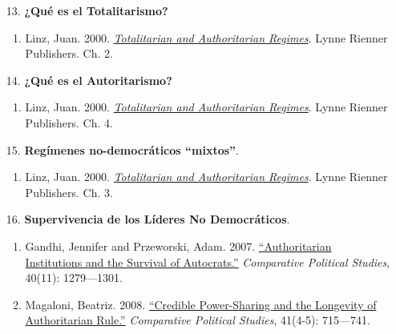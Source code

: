 \documentclass[letterpaper]{article}
\begin{document}
\begin{enumerate}
\begin{enumerate}
				\item[13.] {\bf ¿Qu\'e es el Totalitarismo?}
					\begin{enumerate}
						\item Linz, Juan. 2000. \href{https://github.com/hbahamonde/Ciencia_Politica_I/raw/master/Readings/Linz_2000.pdf}{\emph{Totalitarian and Authoritarian Regimes}}. Lynne Rienner Publishers. Ch. 2.
					\end{enumerate}

				\item[14.] {\bf ¿Qu\'e es el Autoritarismo?}
					\begin{enumerate}
						\item Linz, Juan. 2000. \href{https://github.com/hbahamonde/Ciencia_Politica_I/raw/master/Readings/Linz_2000.pdf}{\emph{Totalitarian and Authoritarian Regimes}}. Lynne Rienner Publishers. Ch. 4.
					\end{enumerate}


        \item[15.] {\bf Reg\'imenes no-democr\'aticos ``mixtos''}.
          \begin{enumerate}
            \item Linz, Juan. 2000. \href{https://github.com/hbahamonde/Ciencia_Politica_I/raw/master/Readings/Linz_2000.pdf}{\emph{Totalitarian and Authoritarian Regimes}}. Lynne Rienner Publishers. Ch. 3.
          \end{enumerate}


				\item[16.] {\bf Supervivencia de los L\'ideres No Democr\'aticos}.
					\begin{enumerate}
						\item Gandhi, Jennifer and Przeworski, Adam. 2007. \href{https://github.com/hbahamonde/Ciencia_Politica_I/raw/master/Readings/Gandhi_Przeworski.pdf}{``Authoritarian Institutions and the Survival of Autocrats.''} \emph{Comparative Political Studies}, 40(11): 1279---1301.
						
						\item Magaloni, Beatriz. 2008. \href{https://github.com/hbahamonde/Ciencia_Politica_I/raw/master/Readings/Magaloni.pdf}{``Credible Power-Sharing and the Longevity of Authoritarian Rule.''} \emph{Comparative Political Studies}, 41(4-5): 715---741.
					\end{enumerate}
				



\end{enumerate}
\end{enumerate}
\end{document}
